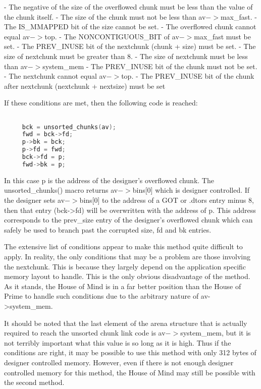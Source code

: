 \documentclass[12pt]{article}
\begin{document}
     - The negative of the size of the overflowed chunk must
       be less than the value of the chunk itself.
     - The size of the chunk must not be less than av$->$max\_fast.
     - The IS_MMAPPED bit of the size cannot be set.
     - The overflowed chunk cannot equal av$->$top.
     - The NONCONTIGUOUS_BIT of av$->$max\_fast must be set.
     - The PREV_INUSE bit of the nextchunk (chunk + size)
       must be set.
     - The size of nextchunk must be greater than 8.
     - The size of nextchunk must be less than av$->$system_mem
     - The PREV_INUSE bit of the chunk must not be set.
     - The nextchunk cannot equal av$->$top.
     - The PREV_INUSE bit of the chunk after nextchunk
       (nextchunk + nextsize) must be set

If these conditions are met, then the following code is reached:
\begin{lstlisting}[language=C]

     bck = unsorted_chunks(av);
     fwd = bck->fd;
     p->bk = bck;
     p->fd = fwd;
     bck->fd = p;
     fwd->bk = p;
\end{lstlisting}
In this case p is the address of the designer's overflowed chunk.
The unsorted\_chunks() macro returns av$->$bins[0] which is designer
controlled. If the designer sets av$->$bins[0] to the address of a
GOT or .dtors entry minus 8, then that entry (bck->fd) will be
overwritten with the address of p. This address corresponds to the
prev_size entry of the designer's overflowed chunk which can safely
be used to branch past the corrupted size, fd and bk entries.
\newline


The extensive list of conditions appear to make this method quite
difficult to apply. In reality, the only conditions that may be a
problem are those involving the nextchunk. This is because they
largely depend on the application specific memory layout to handle.
This is the only obvious disadvantage of the method. As it stands,
the House of Mind is in a far better position than the House of
Prime to handle such conditions due to the arbitrary nature of av-
>system_mem.
\newline


It should be noted that the last element of the arena structure
that is actually required to reach the unsorted chunk link code is
av$->$system_mem, but it is not terribly important what this value is
so long as it is high. Thus if the conditions are right, it may be
possible to use this method with only 312 bytes of designer
controlled memory. However, even if there is not enough designer
controlled memory for this method, the House of Mind may still be
possible with the second method.
\newline
\end{document}
